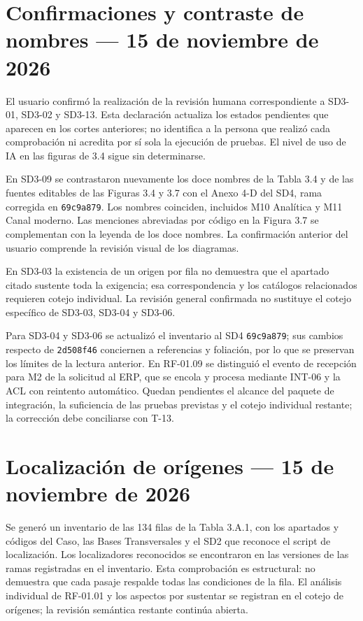 \documentclass[11pt,letterpaper]{article}
\begin{document}
\section*{Confirmaciones y contraste de nombres — 15 de noviembre de 2026}

El usuario confirmó la realización de la revisión humana correspondiente a SD3-01, SD3-02 y SD3-13. Esta declaración actualiza los estados pendientes que aparecen en los cortes anteriores; no identifica a la persona que realizó cada comprobación ni acredita por sí sola la ejecución de pruebas. El nivel de uso de IA en las figuras de 3.4 sigue sin determinarse.

En SD3-09 se contrastaron nuevamente los doce nombres de la Tabla 3.4 y de las fuentes editables de las Figuras 3.4 y 3.7 con el Anexo 4-D del SD4, rama corregida en \texttt{69c9a879}. Los nombres coinciden, incluidos M10 Analítica y M11 Canal moderno. Las menciones abreviadas por código en la Figura 3.7 se complementan con la leyenda de los doce nombres. La confirmación anterior del usuario comprende la revisión visual de los diagramas.

En SD3-03 la existencia de un origen por fila no demuestra que el apartado citado sustente toda la exigencia; esa correspondencia y los catálogos relacionados requieren cotejo individual. La revisión general confirmada no sustituye el cotejo específico de SD3-03, SD3-04 y SD3-06.

Para SD3-04 y SD3-06 se actualizó el inventario al SD4 \texttt{69c9a879}; sus cambios respecto de \texttt{2d508f46} conciernen a referencias y foliación, por lo que se preservan los límites de la lectura anterior. En RF-01.09 se distinguió el evento de recepción para M2 de la solicitud al ERP, que se encola y procesa mediante INT-06 y la ACL con reintento automático. Quedan pendientes el alcance del paquete de integración, la suficiencia de las pruebas previstas y el cotejo individual restante; la corrección debe conciliarse con T-13.

\section*{Localización de orígenes — 15 de noviembre de 2026}

Se generó un inventario de las 134 filas de la Tabla 3.A.1, con los apartados y códigos del Caso, las Bases Transversales y el SD2 que reconoce el script de localización. Los localizadores reconocidos se encontraron en las versiones de las ramas registradas en el inventario. Esta comprobación es estructural: no demuestra que cada pasaje respalde todas las condiciones de la fila. El análisis individual de RF-01.01 y los aspectos por sustentar se registran en el cotejo de orígenes; la revisión semántica restante continúa abierta.
\end{document}
